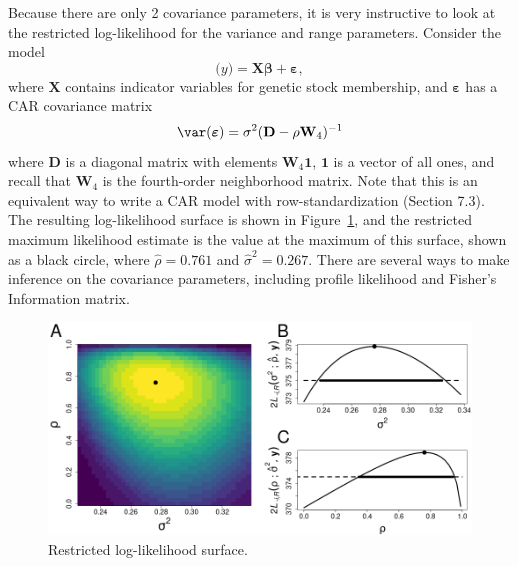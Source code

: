 \documentclass[12pt, titlepage]{article}
\begin{document}
Because there are only 2 covariance parameters, it is very instructive to look at the restricted log-likelihood for the variance and range parameters.  Consider the model
\begin{equation} \label{eq:seals_splm}
\mathbf(y) = \mathbf{X}\boldsymbol{\beta} + \boldsymbol{\varepsilon},
\end{equation}
where $\mathbf{X}$ contains indicator variables for genetic stock membership, and $\boldsymbol{\varepsilon}$ has a CAR covariance matrix
$$
\var(\boldsymbol{\varepsilon}) = \sigma^{2}(\mathbf{D} - \rho\mathbf{W}_{4})^{-1}
$$
where $\mathbf{D}$ is a diagonal matrix with elements $\mathbf{W}_{4}\mathbf{1}$, $\mathbf{1}$ is a vector of all ones, and recall that $\mathbf{W}_{4}$ is the fourth-order neighborhood matrix. Note that this is an equivalent way to write a CAR model with row-standardization (Section 7.3). The resulting log-likelihood surface is shown in Figure~\ref{Fig:Seals_logLik}, and the restricted maximum likelihood estimate is the value at the maximum of this surface, shown as a black circle, where $\hat{\rho} = 0.761$ and $\hat{\sigma}^{2} = 0.267$.  There are several ways to make inference on the covariance parameters, including profile likelihood and Fisher's Information matrix.
\begin{figure}[H]
  \begin{center}
	    \includegraphics[width=1\linewidth]{Seals_logLik}
  \end{center}
  \caption{Restricted log-likelihood surface.  \label{Fig:Seals_logLik}}
\end{figure}
\end{document}
